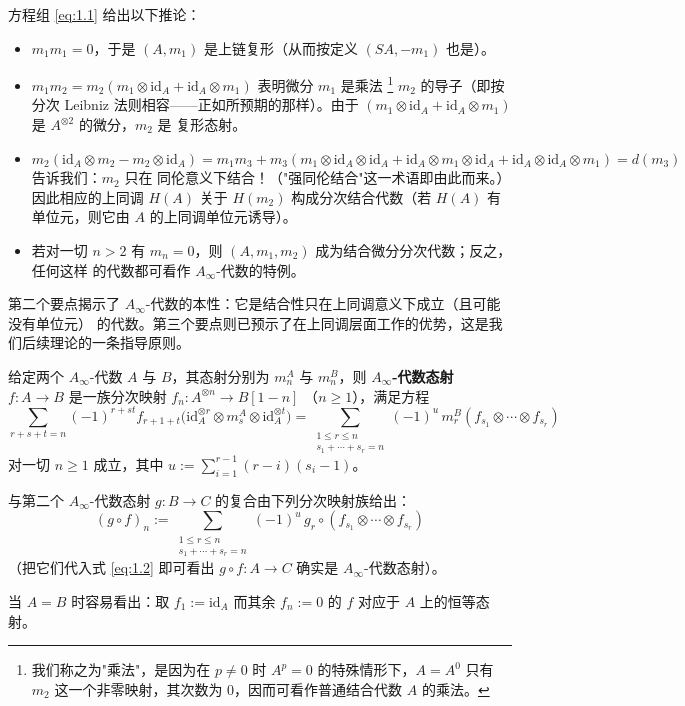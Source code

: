 \begin{Rem}\label{rem:1.5}
方程组 \eqref{eq:1.1} 给出以下推论：
\begin{itemize}[leftmargin=2em]
  \item $m_1m_1=0$，于是 $(A,m_1)$ 是上链复形（从而按定义 $(SA,-m_1)$ 也是）。
  \item $m_1m_2=m_2(m_1\otimes\mathrm{id}_A+\mathrm{id}_A\otimes m_1)$ 表明微分 $m_1$ 是乘法%
  \footnote{我们称之为"乘法"，是因为在 $p\neq 0$ 时 $A^p=0$ 的特殊情形下，$A=A^0$ 只有
  $m_2$ 这一个非零映射，其次数为 $0$，因而可看作普通结合代数 $A$ 的乘法。}
  $m_2$ 的导子（即按分次 Leibniz 法则相容——正如所预期的那样）。由于
  $(m_1\otimes\mathrm{id}_A+\mathrm{id}_A\otimes m_1)$ 是 $A^{\otimes 2}$ 的微分，$m_2$ 是
  复形态射。
  \item $m_2(\mathrm{id}_A\otimes m_2-m_2\otimes\mathrm{id}_A)
  =m_1m_3+m_3(m_1\otimes\mathrm{id}_A\otimes\mathrm{id}_A+\mathrm{id}_A\otimes m_1\otimes
  \mathrm{id}_A+\mathrm{id}_A\otimes\mathrm{id}_A\otimes m_1)=d(m_3)$ 告诉我们：$m_2$ 只在
  同伦意义下结合！（"强同伦结合"这一术语即由此而来。）因此相应的上同调 $H(A)$ 关于
  $H(m_2)$ 构成分次结合代数（若 $H(A)$ 有单位元，则它由 $A$ 的上同调单位元诱导）。
  \item 若对一切 $n>2$ 有 $m_n=0$，则 $(A,m_1,m_2)$ 成为结合微分分次代数；反之，任何这样
  的代数都可看作 $A_\infty$-代数的特例。
\end{itemize}
\end{Rem}

第二个要点揭示了 $A_\infty$-代数的本性：它是结合性只在上同调意义下成立（且可能没有单位元）
的代数。第三个要点则已预示了在上同调层面工作的优势，这是我们后续理论的一条指导原则。

\begin{Def}\label{def:1.6}
给定两个 $A_\infty$-代数 $A$ 与 $B$，其态射分别为 $m_n^A$ 与 $m_n^B$，则
\textbf{$A_\infty$-代数态射} $f:A\to B$ 是一族分次映射 $f_n:A^{\otimes n}\to B[1-n]$
（$n\ge 1$），满足方程
\begin{equation}\label{eq:1.2}
  \sum_{r+s+t=n}(-1)^{r+st}f_{r+1+t}
  \bigl(\mathrm{id}_A^{\otimes r}\otimes m_s^A\otimes\mathrm{id}_A^{\otimes t}\bigr)
  =\sum_{\substack{1\le r\le n\\ s_1+\cdots+s_r=n}}(-1)^u\,
  m_r^B(f_{s_1}\otimes\cdots\otimes f_{s_r})
\end{equation}
对一切 $n\ge 1$ 成立，其中 $u:=\sum_{i=1}^{r-1}(r-i)(s_i-1)$。

与第二个 $A_\infty$-代数态射 $g:B\to C$ 的复合由下列分次映射族给出：
\[
  (g\circ f)_n:=\sum_{\substack{1\le r\le n\\ s_1+\cdots+s_r=n}}(-1)^u\,
  g_r\circ(f_{s_1}\otimes\cdots\otimes f_{s_r})
\]
（把它们代入式 \eqref{eq:1.2} 即可看出 $g\circ f:A\to C$ 确实是 $A_\infty$-代数态射）。

当 $A=B$ 时容易看出：取 $f_1:=\mathrm{id}_A$ 而其余 $f_n:=0$ 的 $f$ 对应于 $A$ 上的恒等态射。
\end{Def}

